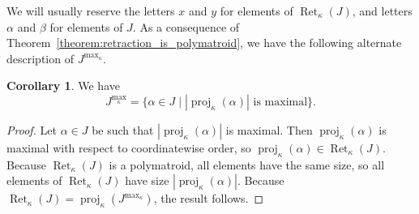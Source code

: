 \documentclass[11pt]{article}
\theoremstyle{definition}
\newtheorem{corollary}[theorem]{Corollary}
\theoremstyle{remark}
\DeclareMathOperator{\proj}{proj}              %
\newcommand{\kproj}{\proj_{\kappa}}            %
\DeclareMathOperator{\Ret}{Ret}                %
\newcommand{\RetK}{\Ret_{\kappa}}              %
\newcommand{\Jmax}{J^{\max_{\kappa}}}
\begin{document}
We will usually reserve the letters $x$ and $y$ for elements of $\RetK(J)$, and letters $\alpha$ and $\beta$ for elements of $J$. As a consequence of Theorem~\ref{theorem:retraction_is_polymatroid}, we have the following alternate description of $\Jmax$.
\begin{corollary} \label{corollary:Jmax_size_description}
    We have
    \[
        \Jmax = \{\alpha\in J \mid |\kproj(\alpha)| \text{ is maximal}\}.
    \]
\end{corollary}
\begin{proof}
    Let $\alpha \in J$ be such that $|\kproj(\alpha)|$ is maximal. Then $\kproj(\alpha)$ is maximal with respect to coordinatewise order, so $\kproj(\alpha) \in \RetK(J)$. Because $\RetK(J)$ is a polymatroid, all elements have the same size, so all elements of $\RetK(J)$ have size $|\kproj(\alpha)|$. Because $\RetK(J) = \kproj(\Jmax)$, the result follows.
\end{proof}
\end{document}
